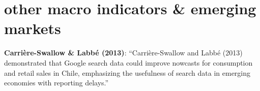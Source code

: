 \documentclass{article}
\begin{document}
\section{other macro indicators \& emerging markets}
\textbf{Carrière-Swallow \& Labbé (2013)}: “Carrière-Swallow and Labbé (2013) demonstrated that Google search data could improve nowcasts for consumption and retail sales in Chile, emphasizing the usefulness of search data in emerging economies with reporting delays.”
\end{document}
